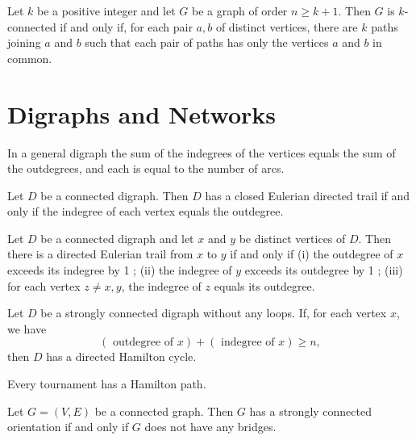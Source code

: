 \begin{theorem}
  \label{thm:12.6.7}
  Let $k$ be a positive integer and let $G$ be a graph of order $n \geq k +1$. Then $G$ is $k$-connected if and only if, for each pair $a, b$ of distinct vertices, there are $k$ paths joining $a$ and $b$ such that each pair of paths has only the vertices $a$ and $b$ in common.
\end{theorem}

\chapter{Digraphs and Networks}

\begin{theorem}
  \label{thm:13.1.1}
  In a general digraph the sum of the indegrees of the vertices equals the sum of the outdegrees, and each is equal to the number of arcs.
\end{theorem}

\begin{theorem}
  \label{thm:13.1.2}
  Let $D$ be a connected digraph. Then $D$ has a closed Eulerian directed trail if and only if the indegree of each vertex equals the outdegree.
\end{theorem}

\begin{theorem}
  \label{thm:13.1.3}
  Let $D$ be a connected digraph and let $x$ and $y$ be distinct vertices of $D$. Then there is a directed Eulerian trail from $x$ to $y$ if and only if
  (i) the outdegree of $x$ exceeds its indegree by 1 ;
  (ii) the indegree of $y$ exceeds its outdegree by 1 ;
  (iii) for each vertex $z \neq x, y$, the indegree of $z$ equals its outdegree.
\end{theorem}

\begin{theorem}
  \label{thm:13.1.4}
  Let $D$ be a strongly connected digraph without any loops. If, for each vertex $x$, we have
  $$
  (\text { outdegree of } x)+(\text { indegree of } x) \geq n,
  $$
  then $D$ has a directed Hamilton cycle.
\end{theorem}

\begin{theorem}
  \label{thm:13.1.5}
  Every tournament has a Hamilton path.
\end{theorem}

\begin{theorem}
  \label{thm:13.1.6}
  Let $G = (V, E)$ be a connected graph. Then $G$ has a strongly connected orientation if and only if $G$ does not have any bridges.
\end{theorem}

